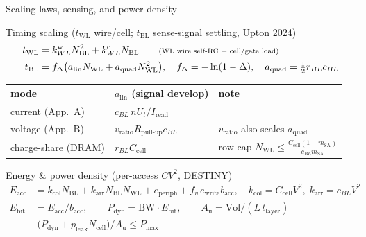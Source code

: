 \documentclass[aspectratio=169,10pt]{beamer}
\newcommand{\Nbl}{N_{\mathrm{BL}}}
\newcommand{\Nwl}{N_{\mathrm{WL}}}
\newcommand{\twl}{t_{\mathrm{WL}}}
\newcommand{\tbl}{t_{\mathrm{BL}}}
\newcommand{\bacc}{b_{\mathrm{acc}}}
\newcommand{\Eacc}{E_{\mathrm{acc}}}
\newcommand{\Ebit}{E_{\mathrm{bit}}}
\newcommand{\Pdyn}{P_{\mathrm{dyn}}}
\newcommand{\Pmax}{P_{\max}}
\newcommand{\Aused}{A_{\mathrm{u}}}
\newcommand{\Ncell}{N_{\mathrm{cell}}}
\begin{document}
\begin{frame}{Scaling laws, sensing, and power density}
\footnotesize

\begin{block}{Timing scaling ($\twl$ wire/cell; $\tbl$ sense-signal settling, Upton 2024)}
\vspace{-1.0ex}
\begin{align*}
  \twl &= k^{\mathrm{w}}_{WL}\Nbl^2 + k^{\mathrm{c}}_{WL}\Nbl
        \qquad\text{\scriptsize(WL wire self-RC + cell/gate load)} \\[0.2ex]
  \tbl &= f_\Delta\big(a_{\mathrm{lin}}\Nwl + a_{\mathrm{quad}}\Nwl^2\big),
        \quad f_\Delta = -\ln(1-\Delta),
        \quad a_{\mathrm{quad}} = \tfrac12 r_{BL}c_{BL}
\end{align*}
\vspace{-1.8ex}
\begin{center}\scriptsize
\begin{tabular}{@{}l l l@{}}
\toprule
mode & $a_{\mathrm{lin}}$ (signal develop) & note \\
\midrule
current (App.\ A) & $c_{BL}\,nU_t/I_{\mathrm{read}}$ & \\
voltage (App.\ B) & $v_{\mathrm{ratio}}R_{\text{pull-up}}c_{BL}$ & $v_{\mathrm{ratio}}$ also scales $a_{\mathrm{quad}}$ \\
charge-share (DRAM) & $r_{BL}C_{\mathrm{cell}}$ & row cap $\Nwl\!\le\!\tfrac{C_{\mathrm{cell}}(1-m_{\mathrm{SA}})}{c_{BL}m_{\mathrm{SA}}}$ \\
\bottomrule
\end{tabular}
\end{center}
\end{block}

\vspace{-1.6ex}
\begin{block}{Energy \& power density (per-access $CV^2$, DESTINY)}
\vspace{-1.0ex}
\begin{align*}
  \Eacc &= k_{\mathrm{col}}\Nbl + k_{\mathrm{arr}}\Nbl\Nwl + e_{\mathrm{periph}} + f_w e_{\mathrm{write}}\bacc,
        \quad k_{\mathrm{col}}=C_{\mathrm{cell}}V^2,\; k_{\mathrm{arr}}=c_{BL}V^2 \\[0.3ex]
  \Ebit &= \Eacc/\bacc, \qquad \Pdyn = \mathrm{BW}\cdot\Ebit, \qquad
        \Aused = \mathrm{Vol}/(L\,t_{\mathrm{layer}}) \\[0.3ex]
  &\boxed{\;\big(\Pdyn + p_{\mathrm{leak}}\Ncell\big)\big/\Aused \le \Pmax\;}
\end{align*}
\end{block}

\end{frame}
\end{document}
